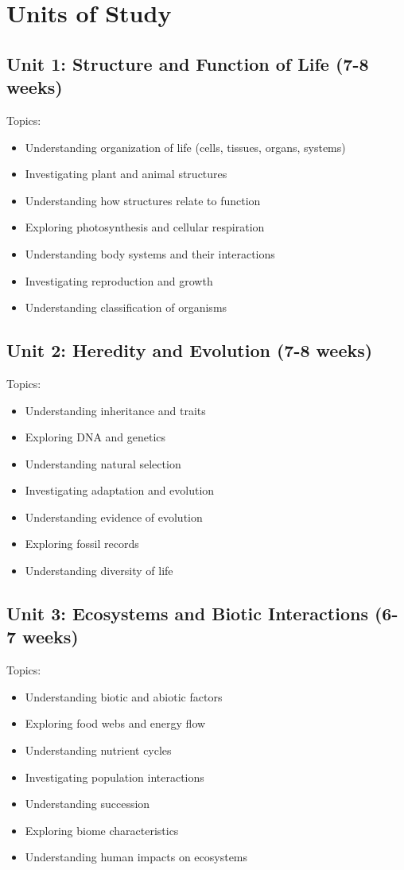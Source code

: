 \documentclass[11pt,letterpaper]{report}
\begin{document}
\section{Units of Study}

\subsection{Unit 1: Structure and Function of Life (7-8 weeks)}

Topics:
\begin{itemize}
\item Understanding organization of life (cells, tissues, organs, systems)
\item Investigating plant and animal structures
\item Understanding how structures relate to function
\item Exploring photosynthesis and cellular respiration
\item Understanding body systems and their interactions
\item Investigating reproduction and growth
\item Understanding classification of organisms
\end{itemize}

\subsection{Unit 2: Heredity and Evolution (7-8 weeks)}

Topics:
\begin{itemize}
\item Understanding inheritance and traits
\item Exploring DNA and genetics
\item Understanding natural selection
\item Investigating adaptation and evolution
\item Understanding evidence of evolution
\item Exploring fossil records
\item Understanding diversity of life
\end{itemize}

\subsection{Unit 3: Ecosystems and Biotic Interactions (6-7 weeks)}

Topics:
\begin{itemize}
\item Understanding biotic and abiotic factors
\item Exploring food webs and energy flow
\item Understanding nutrient cycles
\item Investigating population interactions
\item Understanding succession
\item Exploring biome characteristics
\item Understanding human impacts on ecosystems
\end{itemize}
\end{document}
